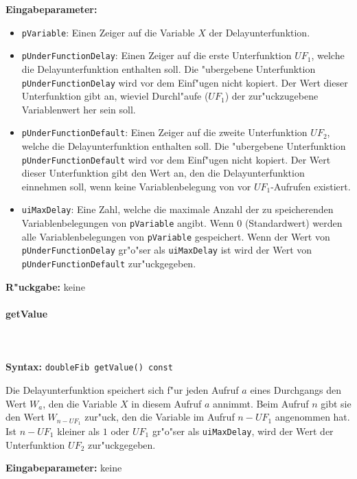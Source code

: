 \bigskip\noindent
\textbf{Eingabeparameter:}
\begin{itemize}
 \item \verb|pVariable|: Einen Zeiger auf die Variable $X$ der Delayunterfunktion.
 \item \verb|pUnderFunctionDelay|: Einen Zeiger auf die erste Unterfunktion $UF_1$, welche die Delayunterfunktion enthalten soll. Die "ubergebene Unterfunktion \verb|pUnderFunctionDelay| wird vor dem Einf"ugen nicht kopiert. Der Wert dieser Unterfunktion gibt an, wieviel Durchl"aufe ($UF_1$) der zur"uckzugebene Variablenwert her sein soll.
 \item \verb|pUnderFunctionDefault|: Einen Zeiger auf die zweite Unterfunktion $UF_2$, welche die Delayunterfunktion enthalten soll. Die "ubergebene Unterfunktion \verb|pUnderFunctionDefault| wird vor dem Einf"ugen nicht kopiert. Der Wert dieser Unterfunktion gibt den Wert an, den die Delayunterfunktion einnehmen soll, wenn keine Variablenbelegung von vor $UF_1$-Aufrufen existiert.
 \item \verb|uiMaxDelay|: Eine Zahl, welche die maximale Anzahl der zu speicherenden Variablenbelegungen von \verb|pVariable| angibt. Wenn 0 (Standardwert) werden alle Variablenbelegungen von \verb|pVariable| gespeichert. Wenn der Wert von \verb|pUnderFunctionDelay| gr"o"ser als \verb|uiMaxDelay| ist wird der Wert von \verb|pUnderFunctionDefault| zur"uckgegeben.
\end{itemize}

\bigskip\noindent
\textbf{R"uckgabe:} keine


\paragraph{getValue}

\ \\\\\noindent
\textbf{Syntax:} \verb|doubleFib getValue() const|

\bigskip\noindent
Die Delayunterfunktion speichert sich f"ur jeden Aufruf $a$ eines Durchgangs den Wert $W_a$, den die Variable $X$ in diesem Aufruf $a$ annimmt. Beim Aufruf $n$ gibt sie den Wert $W_{n-UF_1}$ zur"uck, den die Variable im Aufruf $n-UF_1$ angenommen hat. Ist $n-UF_1$ kleiner als $1$ oder $UF_1$ gr"o"ser als \verb|uiMaxDelay|, wird der Wert der Unterfunktion $UF_2$ zur"uckgegeben.

\bigskip\noindent
\textbf{Eingabeparameter:} keine


